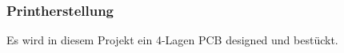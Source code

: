 \subsubsection{Printherstellung}
Es wird in diesem Projekt ein 4-Lagen PCB designed und bestückt.\\
